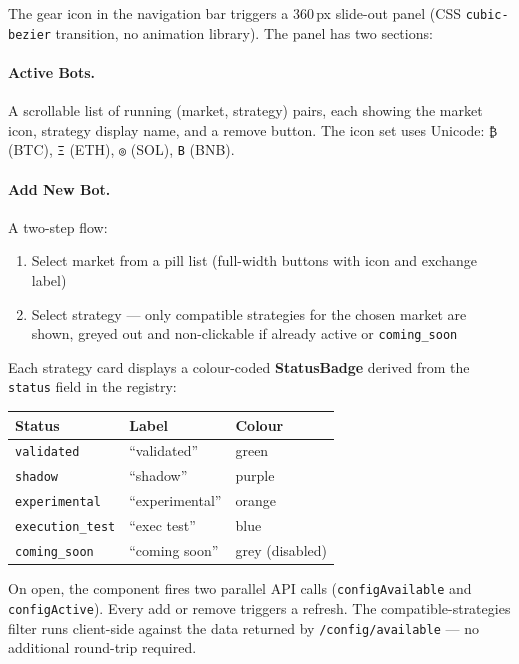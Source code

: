 \documentclass[11pt,a4paper]{article}
\newcommand{\code}[1]{\texttt{#1}}
\begin{document}
The gear icon in the navigation bar triggers a 360\,px slide-out panel (CSS \code{cubic-bezier} transition, no animation library). The panel has two sections:

\paragraph{Active Bots.} A scrollable list of running (market, strategy) pairs, each showing the market icon, strategy display name, and a remove button. The icon set uses Unicode: \texttt{₿} (BTC), \texttt{Ξ} (ETH), \texttt{◎} (SOL), \texttt{B} (BNB).

\paragraph{Add New Bot.} A two-step flow:
\begin{enumerate}[noitemsep]
  \item Select market from a pill list (full-width buttons with icon and exchange label)
  \item Select strategy --- only compatible strategies for the chosen market are shown, greyed out and non-clickable if already active or \code{coming\_soon}
\end{enumerate}

Each strategy card displays a colour-coded \textbf{StatusBadge} derived from the \code{status} field in the registry:

\begin{center}
\begin{tabular}{@{}lll@{}}
\toprule
\textbf{Status} & \textbf{Label} & \textbf{Colour} \\
\midrule
\code{validated}      & ``validated''  & green \\
\code{shadow}         & ``shadow''     & purple \\
\code{experimental}   & ``experimental'' & orange \\
\code{execution\_test} & ``exec test'' & blue \\
\code{coming\_soon}   & ``coming soon'' & grey (disabled) \\
\bottomrule
\end{tabular}
\end{center}

On open, the component fires two parallel API calls (\code{configAvailable} and \code{configActive}). Every add or remove triggers a refresh. The compatible-strategies filter runs client-side against the data returned by \code{/config/available} --- no additional round-trip required.
\end{document}
